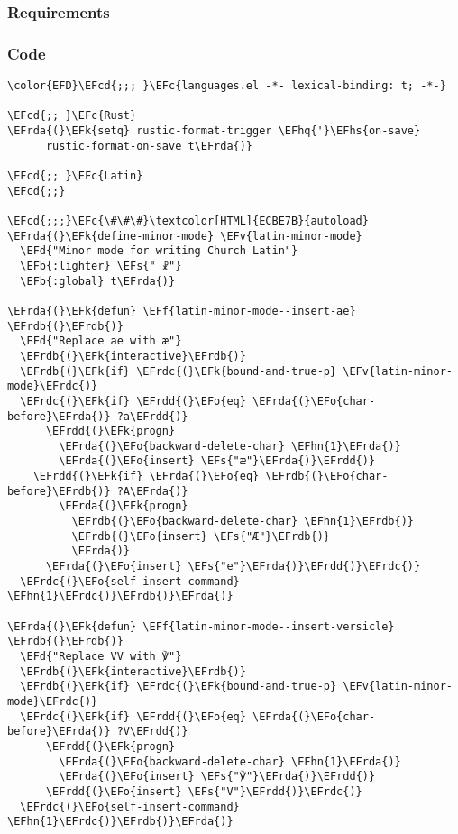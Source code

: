 \documentclass[a4wide,10pt]{article}
\newcommand{\EFc}[1]{\textcolor{EFc}{#1}} %
\newcommand{\EFcd}[1]{\textcolor{EFcd}{#1}} %
\newcommand{\EFs}[1]{\textcolor{EFs}{#1}} %
\newcommand{\EFd}[1]{\textcolor{EFd}{#1}} %
\newcommand{\EFk}[1]{\textcolor{EFk}{#1}} %
\newcommand{\EFb}[1]{\textcolor{EFb}{#1}} %
\newcommand{\EFf}[1]{\textcolor{EFf}{#1}} %
\newcommand{\EFv}[1]{\textcolor{EFv}{#1}} %
\newcommand{\EFo}[1]{\textcolor{EFo}{#1}} %
\newcommand{\EFhn}[1]{\textcolor{EFhn}{\textbf{#1}}} %
\newcommand{\EFhq}[1]{\textcolor{EFhq}{#1}} %
\newcommand{\EFhs}[1]{\textcolor{EFhs}{#1}} %
\newcommand{\EFrda}[1]{\textcolor{EFrda}{#1}} %
\newcommand{\EFrdb}[1]{\textcolor{EFrdb}{#1}} %
\newcommand{\EFrdc}[1]{\textcolor{EFrdc}{#1}} %
\newcommand{\EFrdd}[1]{\textcolor{EFrdd}{#1}} %
\begin{document}
\subsubsection{Requirements}
\label{sec:org6dd0610}
\subsubsection{Code}
\label{sec:org1993a56}
\begin{Code}
\begin{Verbatim}
\color{EFD}\EFcd{;;; }\EFc{languages.el -*- lexical-binding: t; -*-}

\EFcd{;; }\EFc{Rust}
\EFrda{(}\EFk{setq} rustic-format-trigger \EFhq{'}\EFhs{on-save}
      rustic-format-on-save t\EFrda{)}

\EFcd{;; }\EFc{Latin}
\EFcd{;;}

\EFcd{;;;}\EFc{\#\#\#}\textcolor[HTML]{ECBE7B}{autoload}
\EFrda{(}\EFk{define-minor-mode} \EFv{latin-minor-mode}
  \EFd{"Minor mode for writing Church Latin"}
  \EFb{:lighter} \EFs{" ☧"}
  \EFb{:global} t\EFrda{)}

\EFrda{(}\EFk{defun} \EFf{latin-minor-mode--insert-ae} \EFrdb{(}\EFrdb{)}
  \EFd{"Replace ae with æ"}
  \EFrdb{(}\EFk{interactive}\EFrdb{)}
  \EFrdb{(}\EFk{if} \EFrdc{(}\EFk{bound-and-true-p} \EFv{latin-minor-mode}\EFrdc{)}
  \EFrdc{(}\EFk{if} \EFrdd{(}\EFo{eq} \EFrda{(}\EFo{char-before}\EFrda{)} ?a\EFrdd{)}
      \EFrdd{(}\EFk{progn}
        \EFrda{(}\EFo{backward-delete-char} \EFhn{1}\EFrda{)}
        \EFrda{(}\EFo{insert} \EFs{"æ"}\EFrda{)}\EFrdd{)}
    \EFrdd{(}\EFk{if} \EFrda{(}\EFo{eq} \EFrdb{(}\EFo{char-before}\EFrdb{)} ?A\EFrda{)}
        \EFrda{(}\EFk{progn}
          \EFrdb{(}\EFo{backward-delete-char} \EFhn{1}\EFrdb{)}
          \EFrdb{(}\EFo{insert} \EFs{"Æ"}\EFrdb{)}
          \EFrda{)}
      \EFrda{(}\EFo{insert} \EFs{"e"}\EFrda{)}\EFrdd{)}\EFrdc{)}
  \EFrdc{(}\EFo{self-insert-command} \EFhn{1}\EFrdc{)}\EFrdb{)}\EFrda{)}

\EFrda{(}\EFk{defun} \EFf{latin-minor-mode--insert-versicle} \EFrdb{(}\EFrdb{)}
  \EFd{"Replace VV with ℣"}
  \EFrdb{(}\EFk{interactive}\EFrdb{)}
  \EFrdb{(}\EFk{if} \EFrdc{(}\EFk{bound-and-true-p} \EFv{latin-minor-mode}\EFrdc{)}
  \EFrdc{(}\EFk{if} \EFrdd{(}\EFo{eq} \EFrda{(}\EFo{char-before}\EFrda{)} ?V\EFrdd{)}
      \EFrdd{(}\EFk{progn}
        \EFrda{(}\EFo{backward-delete-char} \EFhn{1}\EFrda{)}
        \EFrda{(}\EFo{insert} \EFs{"℣"}\EFrda{)}\EFrdd{)}
      \EFrdd{(}\EFo{insert} \EFs{"V"}\EFrdd{)}\EFrdc{)}
  \EFrdc{(}\EFo{self-insert-command} \EFhn{1}\EFrdc{)}\EFrdb{)}\EFrda{)}


\end{Verbatim}
\end{Code}
\end{document}
